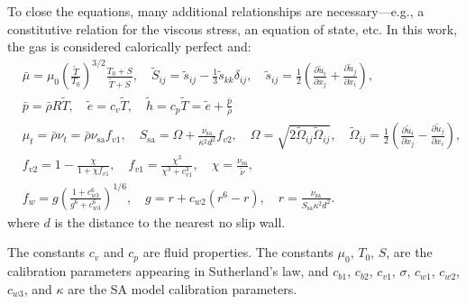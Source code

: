 \documentclass[10pt]{article}
\newcommand{\pp}[2]{\frac{\partial #1}{\partial #2}}
\newcommand{\sa}{\nu_{\mathrm{sa}}}
\begin{document}
To close the equations, many additional relationships are
necessary---e.g., a constitutive relation for the viscous stress, an
equation of state, etc. In this work, the gas is considered calorically perfect and:
%
\begin{equation}
 \begin{split}\label{eq:closure}
&\bar{\mu} = \mu_0 \left( \frac{\tilde{T}}{T_0} \right)^{3/2} \frac{T_0 + S}{\tilde{T} + S}, \quad \tilde{S}_{ij} = \tilde{s}_{ij} - \frac{1}{3} \tilde{s}_{kk} \delta_{ij}, \quad \tilde{s}_{ij} = \frac{1}{2} \left( \pp{\tilde{u}_i}{x_j} + \pp{\tilde{u}_j}{x_i} \right), \\
&\bar{p} = \bar{\rho} R \tilde{T}, \quad \tilde{e} = c_v \tilde{T}, \quad \tilde{h} = c_p \tilde{T} = \tilde{e} + \frac{\bar{p}}{\bar{\rho}} \\
&\mu_t = \bar{\rho} \nu_t = \bar{\rho} \sa f_{v1}, \quad S_{\mathrm{sa}} = \Omega + \frac{\sa}{\kappa^2 d^2} f_{v2}, \quad \Omega = \sqrt{2 \tilde{\Omega}_{ij} \tilde{\Omega}_{ij} }, \quad \widetilde{\Omega}_{ij} = \frac{1}{2} \left( \pp{\tilde{u}_i}{x_j} - \pp{\tilde{u}_j}{x_i} \right), \\
&f_{v2} = 1 - \frac{\chi}{1 + \chi f_{v1}}, \quad f_{v1} = \frac{\chi^3}{\chi^3 + c_{v1}^3}, \quad \chi = \frac{\sa}{\tilde{\nu}}, \\
&f_w = g \left( \frac{1 + c_{w3}^6}{g^6 + c_{w3}^6} \right)^{1/6}, \quad g = r + c_{w2} \left( r^6 - r \right), \quad r = \frac{\sa}{S_{\mathrm{sa}} \kappa^2 d^2}.  
 \end{split}
\end{equation}
%
where $d$ is the distance to the nearest no slip wall.

The constants $c_v$ and $c_p$ are fluid properties.  The constants
$\mu_0$, $T_0$, $S$, are the calibration parameters appearing in
Sutherland's law, and $c_{b1}$, $c_{b2}$, $c_{v1}$, $\sigma$,
$c_{w1}$, $c_{w2}$, $c_{w3}$, and $\kappa$ are the SA model
calibration parameters.\\
\end{document}
